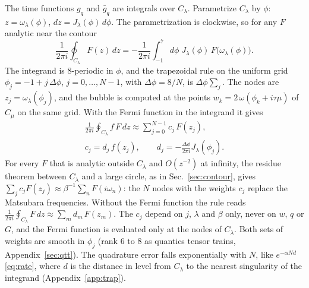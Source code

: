 \documentclass[aps,prb,reprint,a4paper]{revtex4-2}
\begin{document}
The time functions $g_q$ and $\bar g_q$ are integrals over $C_\lambda$. Parametrize $C_\lambda$ by $\phi$: $z=\omega_\lambda(\phi)$, $dz=J_\lambda(\phi)\,d\phi$. The parametrization is clockwise, so for any $F$ analytic near the contour
\begin{equation}
  \frac1{2\pi i}\oint_{C_\lambda}F(z)\,dz=-\frac1{2\pi i}\int_{-1}^{7}d\phi\;J_\lambda(\phi)\,F\big(\omega_\lambda(\phi)\big).
\end{equation}
The integrand is 8-periodic in $\phi$, and the trapezoidal rule on the uniform grid $\phi_j=-1+j\,\Delta\phi$, $j=0,\ldots,N-1$, with $\Delta\phi=8/N$, is $\Delta\phi\sum_j$. The nodes are $z_j=\omega_\lambda(\phi_j)$, and the bubble is computed at the points $w_k=2\,\omega(\phi_k+i\tau\mu)$ of $C_\mu$ on the same grid. With the Fermi function in the integrand it gives
\begin{equation}
  \begin{gathered}
  \frac1{2\pi i}\oint_{C_\lambda}f\,F\,dz\approx\sum_{j=0}^{N-1}c_j\,F(z_j),\\
  c_j=d_j\,f(z_j),\qquad d_j=-\frac{\Delta\phi}{2\pi i}J_\lambda(\phi_j).
  \end{gathered}
  \label{eq:weights}
\end{equation}
For every $F$ that is analytic outside $C_\lambda$ and $O(z^{-2})$ at infinity, the residue theorem between $C_\lambda$ and a large circle, as in Sec.~\ref{sec:contour}, gives $\sum_jc_jF(z_j)\approx\beta^{-1}\sum_nF(i\omega_n)$: the $N$ nodes with the weights $c_j$ replace the Matsubara frequencies. Without the Fermi function the rule reads $\frac1{2\pi i}\oint_{C_\lambda}F\,dz\approx\sum_md_m\,F(z_m)$. The $c_j$ depend on $j$, $\lambda$ and $\beta$ only, never on $w$, $q$ or $G$, and the Fermi function is evaluated only at the nodes of $C_\lambda$. Both sets of weights are smooth in $\phi_j$ (rank 6 to 8 as quantics tensor trains, Appendix~\ref{sec:qtt}). The quadrature error falls exponentially with $N$, like $e^{-\alpha Nd}$ \eqref{eq:rate}, where $d$ is the distance in level from $C_\lambda$ to the nearest singularity of the integrand (Appendix~\ref{app:trap}).
\end{document}
